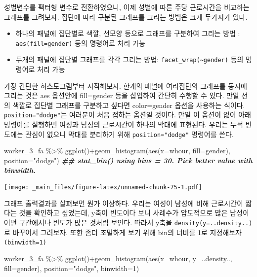 \documentclass[
]{book}
\newenvironment{Shaded}{\begin{snugshade}}{\end{snugshade}}
\newcommand{\AttributeTok}[1]{\textcolor[rgb]{0.77,0.63,0.00}{#1}}
\newcommand{\DecValTok}[1]{\textcolor[rgb]{0.00,0.00,0.81}{#1}}
\newcommand{\DocumentationTok}[1]{\textcolor[rgb]{0.56,0.35,0.01}{\textbf{\textit{#1}}}}
\newcommand{\FunctionTok}[1]{\textcolor[rgb]{0.00,0.00,0.00}{#1}}
\newcommand{\NormalTok}[1]{#1}
\newcommand{\SpecialCharTok}[1]{\textcolor[rgb]{0.00,0.00,0.00}{#1}}
\newcommand{\StringTok}[1]{\textcolor[rgb]{0.31,0.60,0.02}{#1}}
\theoremstyle{definition}
\theoremstyle{definition}
\theoremstyle{definition}
\theoremstyle{definition}
\theoremstyle{remark}
\begin{document}
성별변수를 팩터형 변수로 전환하였으니, 이제 성별에 따른 주당 근로시간을 비교하는 그래프를 그려보자. 집단에 따라 구분된 그래프를 그리는 방법은 크게 두가지가 있다.

\begin{itemize}
\item
  하나의 패널에 집단별로 색깔, 선모양 등으로 그래프를 구분하여 그리는 방법 : \texttt{aes(fill=gender)} 등의 명령어로 처리 가능
\item
  두개의 패널에 집단별 그래프를 각각 그리는 방법: \texttt{facet\_wrap(\textasciitilde{}gender)} 등의 명령어로 처리 가능
\end{itemize}

가장 간단한 히스토그램부터 시작해보자. 한개의 패널에 여러집단의 그래프를 동시에 그리는 것은 aes 옵션안에 fill=gender 등을 삽입하여 간단히 수행할 수 있다. 만일 선의 색깔로 집단별 그래프를 구분하고 싶다면 color=gender 옵션을 사용하는 식이다. \texttt{position="dodge"}는 여러분이 처음 접하는 옵션일 것이다. 만일 이 옵션이 없이 아래 명령어를 실행하면 여성과 남성의 근로시간이 하나의 막대에 표현된다. 우리는 누적 빈도에는 관심이 없으니 막대를 분리하기 위해 \texttt{position="dodge"} 명령어를 쓴다.

\begin{Shaded}
\begin{Highlighting}[]
\NormalTok{worker\_3\_fa }\SpecialCharTok{\%\textgreater{}\%} 
  \FunctionTok{ggplot}\NormalTok{()}\SpecialCharTok{+}\FunctionTok{geom\_histogram}\NormalTok{(}\FunctionTok{aes}\NormalTok{(}\AttributeTok{x=}\NormalTok{whour, }\AttributeTok{fill=}\NormalTok{gender), }\AttributeTok{position=}\StringTok{"dodge"}\NormalTok{)}
\DocumentationTok{\#\# \textasciigrave{}stat\_bin()\textasciigrave{} using \textasciigrave{}bins = 30\textasciigrave{}. Pick better value with \textasciigrave{}binwidth\textasciigrave{}.}
\end{Highlighting}
\end{Shaded}

\texttt{[image: \_main\_files/figure-latex/unnamed-chunk-75-1.pdf]}

그래프 출력결과를 살펴보면 뭔가 이상하다. 우리는 여성이 남성에 비해 근로시간이 짧다는 것을 확인하고 싶었는데, y축이 빈도이다 보니 사례수가 압도적으로 많은 남성이 어떤 구간에서나 빈도가 많은 것처럼 보인다. 따라서 y축을 \texttt{density(y=..density..)}로 바꾸어서 그려보자. 또한 좀더 조밀하게 보기 위해 bin의 너비를 1로 지정해보자\texttt{(binwidth=1)}

\begin{Shaded}
\begin{Highlighting}[]
\NormalTok{worker\_3\_fa }\SpecialCharTok{\%\textgreater{}\%} 
  \FunctionTok{ggplot}\NormalTok{()}\SpecialCharTok{+}\FunctionTok{geom\_histogram}\NormalTok{(}\FunctionTok{aes}\NormalTok{(}\AttributeTok{x=}\NormalTok{whour, }\AttributeTok{y=}\NormalTok{..density.., }\AttributeTok{fill=}\NormalTok{gender), }\AttributeTok{position=}\StringTok{"dodge"}\NormalTok{, }\AttributeTok{binwidth=}\DecValTok{1}\NormalTok{)}
\end{Highlighting}
\end{Shaded}
\end{document}
